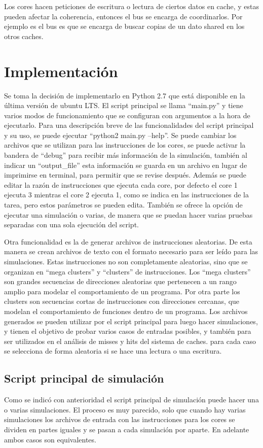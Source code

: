 \documentclass {article}
\begin{document}
Los cores hacen peticiones de escritura o lectura de ciertos datos en cache, y estas pueden afectar
la coherencia, entonces el bus se encarga de coordinarlos. Por ejemplo es el bus es que se
encarga de buscar copias de un dato shared en los otros caches.

\section{Implementación}
Se toma la decisión de implementarlo en Python 2.7 que está disponible en la última versión de
ubuntu LTS. El script principal se llama ``main.py'' y tiene varios modos de funcionamiento que se
configuran con argumentos a la hora de ejecutarlo. Para una descripción breve de las funcionalidades
del script principal y su uso, se puede ejecutar ``python2 main.py --help''. Se puede cambiar los
archivos que se utilizan para las instrucciones de los cores, se puede activar la bandera de
``debug'' para recibir más información de la simulación, también al indicar un ``output\_file'' esta
información se guarda en un archivo en lugar de imprimirse en terminal, para permitir que se revise
después. Además se puede editar la razón de instrucciones que ejecuta cada core, por defecto el core
1 ejecuta 3 mientras el core 2 ejecuta 1, como se indica en las instrucciones de la tarea, pero estos parámetros
se pueden edita. También se ofrece la opción de ejecutar una simulación o varias, de manera que se puedan
hacer varias pruebas separadas con una sola ejecución del script.

Otra funcionalidad es la de
generar archivos de instrucciones aleatorias. De esta manera se crean archivos de texto con el
formato necesario para ser leído para las simulaciones. Estas instrucciones no son completamente
aleatorias, sino que se organizan en ``mega clusters'' y ``clusters'' de instrucciones. Los ``mega
clusters'' son grandes secuencias de direcciones aleatorias que pertenecen a un rango amplio para modelar el
comportamiento de un programa. Por otra parte los clusters son secuencias cortas de instrucciones
con direcciones cercanas, que modelan el comportamiento de funciones dentro de un programa. Los
archivos generados se pueden utilizar por el script principal para luego hacer simulaciones, y
tienen el objetivo de probar varios casos de entradas posibles, y también para ser utilizados en el
análisis de misses y hits del sistema de caches. para cada caso se selecciona de forma aleatoria si
se hace una lectura o una escritura. 

\subsection{Script principal de simulación}
Como se indicó con anterioridad el script principal de simulación puede hacer una o varias
simulaciones. El proceso es muy parecido, solo que cuando hay varias simulaciones los archivos de
entrada con las instrucciones para los cores se dividen en partes iguales y se pasan a cada
simulación por aparte. En adelante ambos casos son equivalentes.
\end{document}
